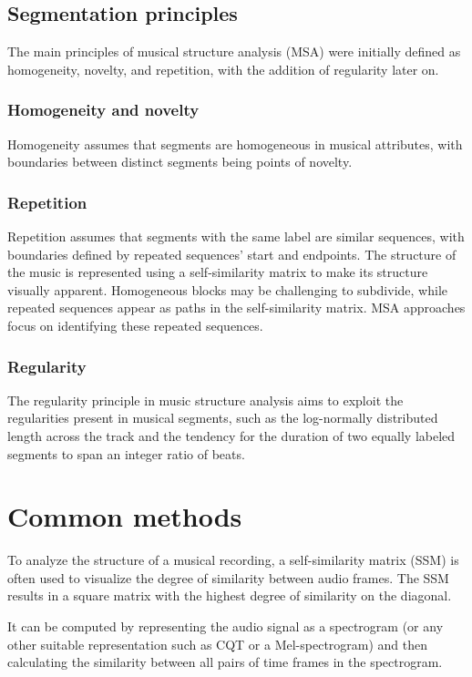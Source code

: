\subsection{Segmentation principles}
The main principles of musical structure analysis (MSA) were initially defined as homogeneity, novelty, and repetition, with the addition of regularity later on. 

\subsubsection{Homogeneity and novelty}
Homogeneity assumes that segments are homogeneous in musical attributes, with boundaries between distinct segments being points of novelty. 

\subsubsection{Repetition}
Repetition assumes that segments with the same label are similar sequences, with boundaries defined by repeated sequences' start and endpoints. The structure of the music is represented using a self-similarity matrix to make its structure visually apparent. Homogeneous blocks may be challenging to subdivide, while repeated sequences appear as paths in the self-similarity matrix. MSA approaches focus on identifying these repeated sequences.

\subsubsection{Regularity}
The regularity principle in music structure analysis aims to exploit the regularities present in musical segments, such as the log-normally distributed length across the track and the tendency for the duration of two equally labeled segments to span an integer ratio of beats.

\section{Common methods}

To analyze the structure of a musical recording, a self-similarity matrix (SSM) is often used to visualize the degree of similarity between audio frames. The SSM results in a square matrix with the highest degree of similarity on the diagonal.

It can be computed by representing the audio signal as a spectrogram (or any other suitable representation such as CQT or a Mel-spectrogram) and then calculating the similarity between all pairs of time frames in the spectrogram.

